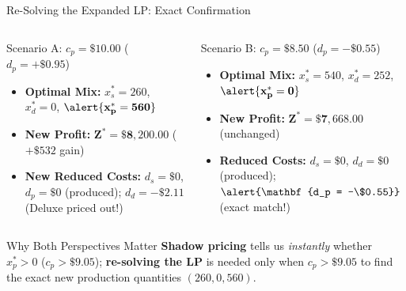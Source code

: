 \documentclass{beamer}
\begin{document}
\begin{frame}{Re-Solving the Expanded LP: Exact Confirmation}
\begin{columns}[T]
\begin{column}{0.48\textwidth}
\begin{exampleblock}{Scenario A: $c_p = \$10.00$ ($d_p = +\$0.95$)}
\small
\begin{itemize}\setlength{\itemsep}{0.2em}
  \item \textbf{Optimal Mix:} $x_s^* = 260$, $x_d^* = 0$, $\alert{\mathbf{x_p^* = 560}}$
  \item \textbf{New Profit:} $\mathbf{Z^* = \$8,200.00}$ ($+\$532$ gain)
  \item \textbf{New Reduced Costs:} $d_s = \$0$, $d_p = \$0$ (produced); $d_d = -\$2.11$ (Deluxe priced out!)
\end{itemize}
\end{exampleblock}
\end{column}

\begin{column}{0.48\textwidth}
\begin{alertblock}{Scenario B: $c_p = \$8.50$ ($d_p = -\$0.55$)}
\small
\begin{itemize}\setlength{\itemsep}{0.2em}
  \item \textbf{Optimal Mix:} $x_s^* = 540$, $x_d^* = 252$, $\alert{\mathbf{x_p^* = 0}}$
  \item \textbf{New Profit:} $\mathbf{Z^* = \$7,668.00}$ (unchanged)
  \item \textbf{Reduced Costs:} $d_s = \$0$, $d_d = \$0$ (produced); $\alert{\mathbf{d_p = -\$0.55}}$ (exact match!)
\end{itemize}
\end{alertblock}
\end{column}
\end{columns}

\vspace{0.2em}
\begin{block}{Why Both Perspectives Matter}
\footnotesize
\textbf{Shadow pricing} tells us \textit{instantly} whether $x_p^* > 0$ ($c_p > \$9.05$); \textbf{re-solving the LP} is needed only when $c_p > \$9.05$ to find the exact new production quantities $(260, 0, 560)$.
\end{block}
\end{frame}
\end{document}
